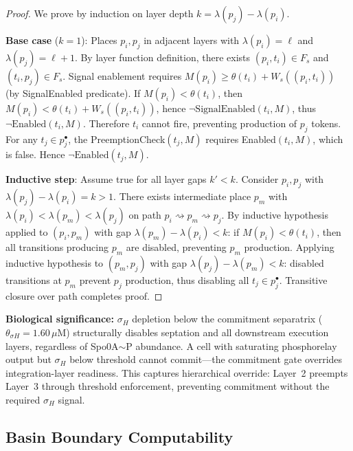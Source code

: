 \documentclass[10pt,letterpaper]{article}
\begin{document}
\begin{proof}
We prove by induction on layer depth $k = \lambda(p_j) - \lambda(p_i)$.

\textbf{Base case} ($k=1$): Places $p_i, p_j$ in adjacent layers with $\lambda(p_i) = \ell$ and $\lambda(p_j) = \ell+1$. By layer function definition, there exists $(p_i,t_i) \in F_s$ and $(t_i,p_j) \in F_s$. Signal enablement requires
$M(p_i) \geq \theta(t_i) + W_s((p_i,t_i))$
(by SignalEnabled predicate). If $M(p_i) < \theta(t_i)$, then
$M(p_i) < \theta(t_i) + W_s((p_i,t_i))$,
hence $\neg\text{SignalEnabled}(t_i,M)$, thus $\neg\text{Enabled}(t_i,M)$. Therefore $t_i$ cannot fire, preventing production of $p_j$ tokens. For any $t_j \in p_j^\bullet$, the PreemptionCheck$(t_j,M)$ requires Enabled$(t_i,M)$, which is false. Hence $\neg\text{Enabled}(t_j,M)$.

\textbf{Inductive step}: Assume true for all layer gaps $k' < k$. Consider $p_i, p_j$ with $\lambda(p_j) - \lambda(p_i) = k > 1$. There exists intermediate place $p_m$ with $\lambda(p_i) < \lambda(p_m) < \lambda(p_j)$ on path $p_i \rightsquigarrow p_m \rightsquigarrow p_j$. By inductive hypothesis applied to $(p_i,p_m)$ with gap $\lambda(p_m) - \lambda(p_i) < k$: if $M(p_i) < \theta(t_i)$, then all transitions producing $p_m$ are disabled, preventing $p_m$ production. Applying inductive hypothesis to $(p_m,p_j)$ with gap $\lambda(p_j) - \lambda(p_m) < k$: disabled transitions at $p_m$ prevent $p_j$ production, thus disabling all $t_j \in p_j^\bullet$. Transitive closure over path completes proof.
\end{proof}

\textbf{Biological significance:} $\sigma_H$ depletion below the commitment separatrix ($\theta_{\sigma H} = 1.60\,\mu$M) structurally disables septation and all downstream execution layers, regardless of Spo0A$\sim$P abundance. A cell with saturating phosphorelay output but $\sigma_H$ below threshold cannot commit---the commitment gate overrides integration-layer readiness. This captures hierarchical override: Layer~2 preempts Layer~3 through threshold enforcement, preventing commitment without the required $\sigma_H$ signal.

\subsection{Basin Boundary Computability}
\end{document}
